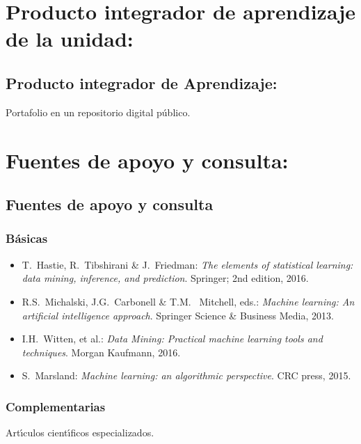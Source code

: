 \documentclass[10 pt]{article}
\begin{document}


\newpage

\section{Producto integrador de aprendizaje de la unidad:}
\subsection{Producto integrador de Aprendizaje:} Portafolio en un repositorio digital p\'{u}blico.

\section{Fuentes de apoyo y consulta:}
\subsection{Fuentes de apoyo y consulta}
\subsubsection{B\'{a}sicas}

\begin{itemize}[itemsep=0em]
  
\item{T.\ {\sc Hastie}, R.\ {\sc Tibshirani} \& J.\ {\sc Friedman}: {\em
      The elements of statistical learning: data mining, inference,
      and prediction}. Springer; 2nd edition, 2016.}
  
\item{R.S.\ {\sc Michalski}, J.G.\ {\sc Carbonell} \& T.M.\ {\sc
      Mitchell}, eds.: {\em Machine learning: An artificial
      intelligence approach}. Springer Science \& Business Media,
    2013.}
  
\item{I.H.\ {\sc Witten}, et al.: {\em Data Mining: Practical machine learning
      tools and techniques}. Morgan Kaufmann, 2016.}
  
\item{S.\ {\sc Marsland}: {\em Machine learning: an algorithmic
      perspective}. CRC press, 2015.}
  
\end{itemize}

\subsubsection{Complementarias}

Art\'{\i}culos cient\'{\i}ficos especializados.

\label{final} %


\end{document}
